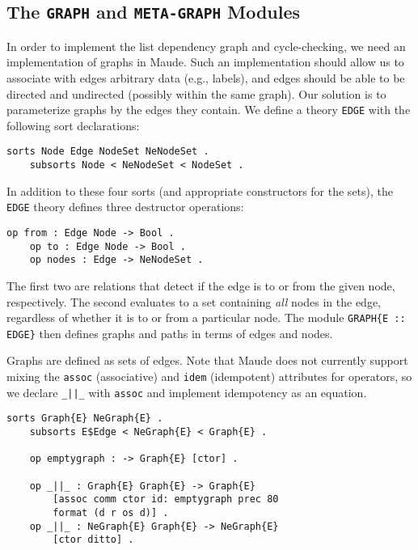 \documentclass[11pt]{article}
\newcommand{\TitleListing}[1]{\texorpdfstring{\lstinline|#1|}{#1}}
\begin{document}
\subsection{The \TitleListing{GRAPH} and \TitleListing{META-GRAPH} Modules}
\label{subsection:graph-mod}

In order to implement the list dependency graph and cycle-checking, we need an
implementation of graphs in Maude. Such an implementation should allow us to
associate with edges arbitrary data (e.g., labels), and edges should be able to
be directed and undirected (possibly within the same graph). Our solution is to
parameterize graphs by the edges they contain. We define a theory
\lstinline|EDGE| with the following sort declarations:
\begin{lstlisting}[language=Maude, style=smalllisting]
    sorts Node Edge NodeSet NeNodeSet .
    subsorts Node < NeNodeSet < NodeSet .
\end{lstlisting}
In addition to these four sorts (and appropriate constructors for the sets),
the \lstinline|EDGE| theory defines three destructor operations:
\begin{lstlisting}[language=Maude, style=smalllisting]
    op from : Edge Node -> Bool .
    op to : Edge Node -> Bool .
    op nodes : Edge -> NeNodeSet .
\end{lstlisting}

The first two are relations that detect if the edge is to or from the given
node, respectively. The second evaluates to a set containing \emph{al{}l} nodes
in the edge, regardless of whether it is to or from a particular node.  The
module \lstinline|GRAPH{E :: EDGE}| then defines graphs and paths in terms of
edges and nodes.

Graphs are defined as sets of edges. Note that Maude does not currently support
mixing the \lstinline|assoc| (associative) and \lstinline|idem| (idempotent)
attributes for operators, so we declare \lstinline!_||_! with \lstinline|assoc|
and implement idempotency as an equation.
\begin{lstlisting}[language=Maude, style=smalllisting]
    sorts Graph{E} NeGraph{E} .
    subsorts E$Edge < NeGraph{E} < Graph{E} .

    op emptygraph : -> Graph{E} [ctor] .

    op _||_ : Graph{E} Graph{E} -> Graph{E}
        [assoc comm ctor id: emptygraph prec 80
        format (d r os d)] .
    op _||_ : NeGraph{E} Graph{E} -> NeGraph{E}
        [ctor ditto] .
\end{lstlisting}
\end{document}
